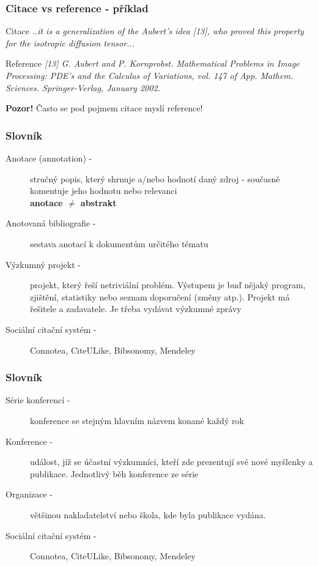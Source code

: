 \documentclass{beamer}
\begin{document}
\begin{frame}
  \frametitle{Citace vs reference - příklad}
  \begin{block}{Citace}
    \textit{..it is a generalization of the Aubert's idea [13], who proved this property 
            for the isotropic diffusion tensor...}
  \end{block}

  \begin{block}{Reference}
     \textit{[13] G. Aubert and P. Kornprobst. Mathematical Problems in Image 
                    Processing: PDE’s and the Calculus of Variations, vol. 147 of 
                    App. Mathem. Sciences. Springer-Verlag, January 2002.}
  \end{block}
  {\textbf{Pozor!} Často se pod pojmem citace myslí reference!}
\end{frame}

\begin{frame}
  \frametitle{Slovník}
  \begin{description}
    \item[Anotace (annotation) -]   {stručný popis, který shrnuje a/nebo hodnotí daný zdroj 
                                     - současně komentuje jeho hodnotu nebo relevanci} \\
    \alert{\textbf{anotace \begin{math} \neq \end{math} abstrakt}}
    \item[Anotovaná bibliografie -] {sestava anotací k dokumentům určitého tématu}
    \item[Výzkumný projekt -] {projekt, který řeší netriviální problém. Výstupem je buď
                               nějaký program, zjištění, statistiky nebo seznam
                               doporučení (změny atp.). Projekt má řešitele a zadavatele. Je třeba
                               vydávat výzkumné zprávy}
    \item[Sociální citační systém -] {Connotea, CiteULike, Bibsonomy, Mendeley}
  \end{description}
\end{frame}

\begin{frame}
  \frametitle{Slovník}
  \begin{description}
    \item[Série konferencí -] {konference se stejným hlavním názvem konané každý rok}
    \item[Konference -] {událost, jíž se účastní výzkumníci, kteří zde prezentují své
                         nové myšlenky a publikace. Jednotlivý běh konference ze série}
    \item[Organizace -] {většinou nakladatelství nebo škola, kde byla publikace vydána.}
    \item[Sociální citační systém -] {Connotea, CiteULike, Bibsonomy, Mendeley}
  \end{description}
\end{frame}
\end{document}

